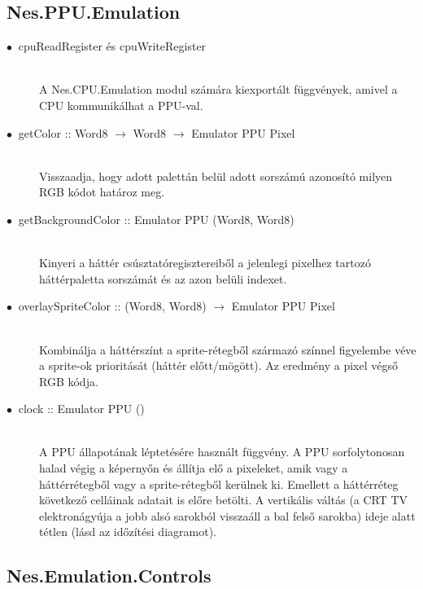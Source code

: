 \subsection{Nes.PPU.Emulation}

\begin{description}
	\item[$\bullet\:$ cpuReadRegister és cpuWriteRegister] \hfill \\
	A Nes.CPU.Emulation modul számára kiexportált függvények, amivel a CPU kommunikálhat a PPU-val.
	\item[$\bullet\:$ getColor :: Word8 $\rightarrow$ Word8 $\rightarrow$ Emulator PPU Pixel] \hfill \\
	Visszaadja, hogy adott palettán belül adott sorszámú azonosító milyen RGB kódot határoz meg.
	\item[$\bullet\:$ getBackgroundColor :: Emulator PPU (Word8, Word8)] \hfill \\
	Kinyeri a háttér csúsztatóregisztereiből a jelenlegi pixelhez tartozó háttérpaletta sorszámát és az azon belüli indexet.  
	\item[$\bullet\:$ overlaySpriteColor :: (Word8, Word8) $\rightarrow$ Emulator PPU Pixel] \hfill \\
	Kombinálja a háttérszínt a sprite-rétegből származó színnel figyelembe véve a sprite-ok prioritását (háttér előtt/mögött). Az eredmény a pixel végső RGB kódja.
	\item[$\bullet\:$ clock :: Emulator PPU ()] \hfill \\
	A PPU állapotának léptetésére használt függvény. A PPU sorfolytonosan halad végig a képernyőn és állítja elő a pixeleket, amik vagy a háttérrétegből vagy a sprite-rétegből kerülnek ki. Emellett a háttérréteg következő celláinak adatait is előre  betölti.
	A vertikális váltás (a CRT TV elektronágyúja a jobb alsó sarokból visszaáll a bal felső sarokba) ideje alatt tétlen (lásd az időzítési diagramot\cite{frametime}).
\end{description}

\subsection{Nes.Emulation.Controls}

